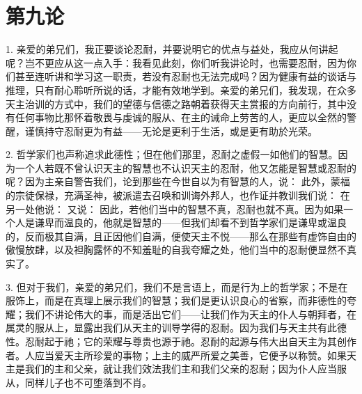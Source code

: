 
\section{第九论}

\par

1. 亲爱的弟兄们，我正要谈论忍耐，并要说明它的优点与益处，我应从何讲起呢？岂不更应从这一点入手：我看见此刻，你们听我讲论时，也需要忍耐，因为你们甚至连听讲和学习这一职责，若没有忍耐也无法完成吗？因为健康有益的谈话与推理，只有耐心聆听所说的话，才能有效地学到。亲爱的弟兄们，我发现，在众多天主治训的方式中，我们的望德与信德之路朝着获得天主赏报的方向前行，其中没有任何事物比那怀着敬畏与虔诚的服从、在主的诫命上劳苦的人，更应以全然的警醒，谨慎持守忍耐更为有益——无论是更利于生活，或是更有助於光荣。\par

2. 哲学家们也声称追求此德性；但在他们那里，忍耐之虚假一如他们的智慧。因为一个人若既不曾认识天主的智慧也不认识天主的忍耐，他又怎能是智慧或忍耐的呢？因为主亲自警告我们，论到那些在今世自以为有智慧的人，说： 此外，蒙福的宗徒保禄，充满圣神，被派遣去召唤和训诲外邦人，也作证并教训我们说： 在另一处他说： 又说： 因此，若他们当中的智慧不真，忍耐也就不真。因为如果一个人是谦卑而温良的，他就是智慧的——但我们却看不到哲学家们是谦卑或温良的，反而极其自满，且正因他们自满，便使天主不悦——那么在那些有虚饰自由的傲慢放肆，以及袒胸露怀的不知羞耻的自我夸耀之处，他们当中的忍耐便显然不真实了。\par

3. 但对于我们，亲爱的弟兄们，我们不是言语上，而是行为上的哲学家；不是在服饰上，而是在真理上展示我们的智慧；我们是更认识良心的省察，而非德性的夸耀；我们不讲论伟大的事，而是活出它们——让我们作为天主的仆人与朝拜者，在属灵的服从上，显露出我们从天主的训导学得的忍耐。因为我们与天主共有此德性。忍耐起于祂；它的荣耀与尊贵也源于祂。忍耐的起源与伟大出自天主为其创作者。人应当爱天主所珍爱的事物；上主的威严所爱之美善，它便予以称赞。如果天主是我们的主和父亲，就让我们效法我们主和我们父亲的忍耐；因为仆人应当服从，同样儿子也不可堕落到不肖。\par

